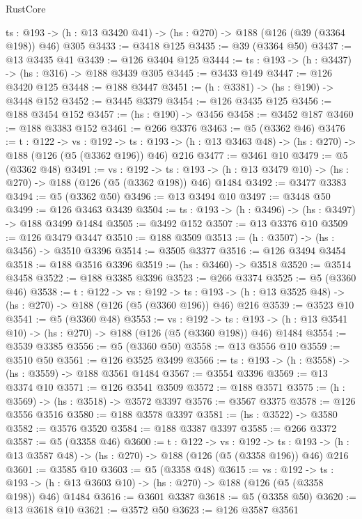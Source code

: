 \begin{lexlean}{RustCore}
\begin{coremodule}
  {ts : @193} -> (h : @13 @3420 @41) -> (hs : @270) -> @188 (@126 (@39 (@3364 @198)) @46) @305
@3433 := @3418 @125
@3435 := @39 (@3364 @50)
@3437 := @13 @3435 @41
@3439 := @126 @3404 @125
@3444 := {ts : @193} -> (h : @3437) -> (hs : @316) -> @188 @3439 @305
@3445 := @3433 @149
@3447 := @126 @3420 @125
@3448 := @188 @3447
@3451 := (h : @3381) -> (hs : @190) -> @3448 @152
@3452 := @3445 @3379
@3454 := @126 @3435 @125
@3456 := @188 @3454 @152
@3457 := (hs : @190) -> @3456
@3458 := @3452 @187
@3460 := @188 @3383 @152
@3461 := @266 @3376
@3463 := @5 (@3362 @46)
@3476 := {t : @122} ->
  {vs : @192} ->
  {ts : @193} -> (h : @13 @3463 @48) -> (hs : @270) -> @188 (@126 (@5 (@3362 @196)) @46) @216
@3477 := @3461 @10
@3479 := @5 (@3362 @48)
@3491 := {vs : @192} ->
  {ts : @193} -> (h : @13 @3479 @10) -> (hs : @270) -> @188 (@126 (@5 (@3362 @198)) @46) @1484
@3492 := @3477 @3383
@3494 := @5 (@3362 @50)
@3496 := @13 @3494 @10
@3497 := @3448 @50
@3499 := @126 @3463 @3439
@3504 := {ts : @193} -> (h : @3496) -> (hs : @3497) -> @188 @3499 @1484
@3505 := @3492 @152
@3507 := @13 @3376 @10
@3509 := @126 @3479 @3447
@3510 := @188 @3509
@3513 := (h : @3507) -> (hs : @3456) -> @3510 @3396
@3514 := @3505 @3377
@3516 := @126 @3494 @3454
@3518 := @188 @3516 @3396
@3519 := (hs : @3460) -> @3518
@3520 := @3514 @3458
@3522 := @188 @3385 @3396
@3523 := @266 @3374
@3525 := @5 (@3360 @46)
@3538 := {t : @122} ->
  {vs : @192} ->
  {ts : @193} -> (h : @13 @3525 @48) -> (hs : @270) -> @188 (@126 (@5 (@3360 @196)) @46) @216
@3539 := @3523 @10
@3541 := @5 (@3360 @48)
@3553 := {vs : @192} ->
  {ts : @193} -> (h : @13 @3541 @10) -> (hs : @270) -> @188 (@126 (@5 (@3360 @198)) @46) @1484
@3554 := @3539 @3385
@3556 := @5 (@3360 @50)
@3558 := @13 @3556 @10
@3559 := @3510 @50
@3561 := @126 @3525 @3499
@3566 := {ts : @193} -> (h : @3558) -> (hs : @3559) -> @188 @3561 @1484
@3567 := @3554 @3396
@3569 := @13 @3374 @10
@3571 := @126 @3541 @3509
@3572 := @188 @3571
@3575 := (h : @3569) -> (hs : @3518) -> @3572 @3397
@3576 := @3567 @3375
@3578 := @126 @3556 @3516
@3580 := @188 @3578 @3397
@3581 := (hs : @3522) -> @3580
@3582 := @3576 @3520
@3584 := @188 @3387 @3397
@3585 := @266 @3372
@3587 := @5 (@3358 @46)
@3600 := {t : @122} ->
  {vs : @192} ->
  {ts : @193} -> (h : @13 @3587 @48) -> (hs : @270) -> @188 (@126 (@5 (@3358 @196)) @46) @216
@3601 := @3585 @10
@3603 := @5 (@3358 @48)
@3615 := {vs : @192} ->
  {ts : @193} -> (h : @13 @3603 @10) -> (hs : @270) -> @188 (@126 (@5 (@3358 @198)) @46) @1484
@3616 := @3601 @3387
@3618 := @5 (@3358 @50)
@3620 := @13 @3618 @10
@3621 := @3572 @50
@3623 := @126 @3587 @3561

\end{coremodule}
\end{lexlean}
